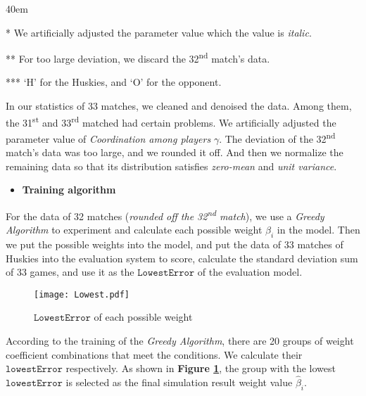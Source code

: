 \documentclass[12pt]{article}  %
\begin{document}
\begin{table}[!htbp]
\begin{center}
\begin{threeparttable}
\begin{tabularx}{40em}
    \end{tabularx}
    \begin{tablenotes}
        \footnotesize
        \item[*] We artificially adjusted the parameter
        value which the value is \textit{italic}. %
        \item[**] For too large deviation, we discard the 32\textsuperscript{nd} match's data. %
        \item[***] `H' for the Huskies, and `O' for the opponent. 
      \end{tablenotes}
    \end{threeparttable}\label{tb:performance_indicators}
    \end{center}
\end{table}

In our statistics of 33 matches, we cleaned and denoised the data. Among them, the 31\textsuperscript{st} and 33\textsuperscript{rd} matched had certain problems. We artificially adjusted the parameter value of \textit{Coordination among players} $\gamma$. The deviation of the 32\textsuperscript{nd} match's data was too large, and we rounded it off. And then we normalize the remaining data so that its distribution satisfies \textit{zero-mean} and \textit{unit variance}.

\vspace{4pt}
\begin{itemize}
    \item \textbf{Training algorithm}
\end{itemize}

For the data of 32 matches (\textit{rounded off the 32\textsuperscript{nd} match}), we use a \textit{Greedy Algorithm} to experiment and calculate each possible weight $\beta_i$ in the model. Then we put the possible weights into the model, and put the data of 33 matches of Huskies into the evaluation system to score, calculate the standard deviation sum of 33 games, and use it as the $\mathtt{LowestError}$ of the evaluation model.

\begin{figure}[htbp]
    \centering
    \texttt{[image: Lowest.pdf]} 	%
    \caption{$\mathtt{LowestError}$ of each possible weight}		%
    \label{fig:LowestError}							%
\end{figure}

According to the training of the \textit{Greedy Algorithm}, there are 20 groups of weight coefficient combinations that meet the conditions. We calculate their $\mathtt{lowestError}$ respectively. As shown in \textbf{Figure \ref{fig:LowestError}}, the group with the lowest $\mathtt{lowestError}$ is selected as the final simulation result weight value $\hat{\beta}_i$.
\end{document}
